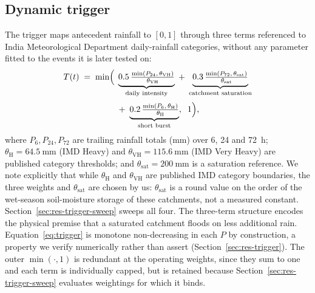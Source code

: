 \documentclass[10pt,twocolumn]{article}
\newcommand{\Tt}{T(t)}
\begin{document}
\subsection{Dynamic trigger}
\label{sec:method-trigger}
The trigger maps antecedent rainfall to $[0,1]$ through three terms referenced to
India Meteorological Department daily-rainfall categories, without any parameter
fitted to the events it is later tested on:
\begin{equation}
\begin{aligned}
\Tt \;=\; \min\Bigl(\;
&\underbrace{0.5\,\tfrac{\min(P_{24},\,\theta_{\mathrm{VH}})}{\theta_{\mathrm{VH}}}}_{\text{daily intensity}}
\;+\; \underbrace{0.3\,\tfrac{\min(P_{72},\,\theta_{\mathrm{sat}})}{\theta_{\mathrm{sat}}}}_{\text{catchment saturation}} \\[2pt]
&+\; \underbrace{0.2\,\tfrac{\min(P_{6},\,\theta_{\mathrm{H}})}{\theta_{\mathrm{H}}}}_{\text{short burst}},
\;\; 1 \Bigr),
\end{aligned}
\label{eq:trigger}
\end{equation}
where $P_{6},P_{24},P_{72}$ are trailing rainfall totals (\si{\milli\metre}) over
6, 24 and \SI{72}{\hour}; $\theta_{\mathrm{H}}=\SI{64.5}{\milli\metre}$ (IMD
Heavy) and $\theta_{\mathrm{VH}}=\SI{115.6}{\milli\metre}$ (IMD Very Heavy) are
published category thresholds; and $\theta_{\mathrm{sat}}=\SI{200}{\milli\metre}$
is a saturation reference. We note explicitly that while $\theta_{\mathrm{H}}$
and $\theta_{\mathrm{VH}}$ are published IMD category boundaries, the three
weights and $\theta_{\mathrm{sat}}$ are chosen by us: $\theta_{\mathrm{sat}}$ is
a round value on the order of the wet-season soil-moisture storage of these
catchments, not a measured constant. Section~\ref{sec:res-trigger-sweep} sweeps
all four. The three-term structure encodes the physical premise
that a saturated catchment floods on less additional rain. Equation~\eqref{eq:trigger}
is monotone non-decreasing in each $P$ by construction, a property we verify
numerically rather than assert (Section~\ref{sec:res-trigger}). The outer
$\min(\cdot,1)$ is redundant at the operating weights, since they sum to one and
each term is individually capped, but is retained because
Section~\ref{sec:res-trigger-sweep} evaluates weightings for which it binds.
\end{document}
